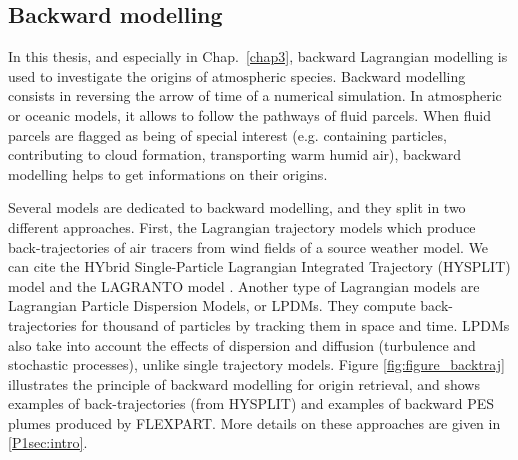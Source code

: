     \subsection{Backward modelling}
    \label{sec:flexpart}
    In this thesis, and especially in Chap.~\ref{chap3}, backward Lagrangian modelling is used to investigate the origins of atmospheric species.
    Backward modelling consists in reversing the arrow of time of a numerical simulation. In atmospheric or oceanic models, it allows to follow the pathways of fluid parcels. When fluid parcels are flagged as being of special interest (e.g. containing particles, contributing to cloud formation, transporting warm humid air), backward modelling helps to get informations on their origins.

    Several models are dedicated to backward modelling, and they split in two different approaches. First, the Lagrangian trajectory models which produce back-trajectories of air tracers from wind fields of a source weather model. We can cite the HYbrid Single-Particle Lagrangian Integrated Trajectory (HYSPLIT) model \citep{stein_noaas_2015} and the LAGRANTO model \citep{sprenger_lagranto_2015}.
    Another type of Lagrangian models are Lagrangian Particle Dispersion Models, or LPDMs. They compute back-trajectories for thousand of particles by tracking them in space and time. LPDMs also take into account the effects of dispersion and diffusion (turbulence and stochastic processes), unlike single trajectory models.
    Figure \ref{fig:figure_backtraj} illustrates the principle of backward modelling for origin retrieval, and shows examples of back-trajectories (from HYSPLIT) and examples of backward PES plumes produced by FLEXPART.
    More details on these approaches are given in \cref{P1sec:intro}.


